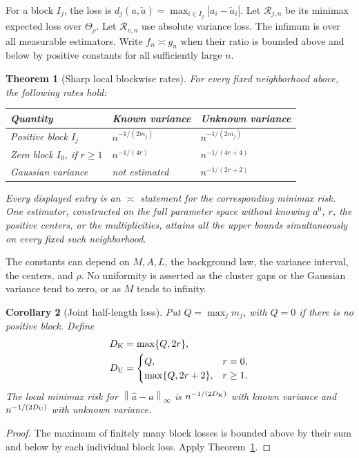 \documentclass[11pt,a4paper]{article}
\numberwithin{equation}{section}
\newtheorem{theorem}{Theorem}[section]
\newtheorem{corollary}[theorem]{Corollary}
\theoremstyle{definition}
\theoremstyle{remark}
\newcommand{\norm}[1]{\left\lVert#1\right\rVert}
\newcommand{\Risk}{\mathcal R}
\begin{document}
For a block $I_j$, the loss is
$d_j(a,\widetilde a)=\max_{i\in I_j}|a_i-\widetilde a_i|$.
Let $\Risk_{j,n}$ be its minimax expected loss over $\Theta_\rho$.
Let $\Risk_{v,n}$ use absolute variance loss. The infimum is over all
measurable estimators. Write $f_n\asymp g_n$ when their ratio is bounded above
and below by positive constants for all sufficiently large $n$.

\begin{theorem}[Sharp local blockwise rates]
\label{thm:main}
For every fixed neighborhood above, the following rates hold:
\begin{center}
\begin{tabular}{@{}lll@{}}
\toprule
Quantity & Known variance & Unknown variance\\
\midrule
Positive block $I_j$ & $n^{-1/(2m_j)}$ & $n^{-1/(2m_j)}$\\
Zero block $I_0$, if $r\ge1$ & $n^{-1/(4r)}$ & $n^{-1/(4r+4)}$\\
Gaussian variance & not estimated & $n^{-1/(2r+2)}$\\
\bottomrule
\end{tabular}
\end{center}
Every displayed entry is an $\asymp$ statement for the corresponding minimax
risk. One estimator, constructed on the full parameter space without knowing
$a^0$, $r$, the positive centers, or the multiplicities, attains all the upper
bounds simultaneously on every fixed such neighborhood.
\end{theorem}

The constants can depend on $M,A,L$, the background law, the variance interval,
the centers, and $\rho$. No uniformity is asserted as the cluster gaps or the
Gaussian variance tend to zero, or as $M$ tends to infinity.

\begin{corollary}[Joint half-length loss]
\label{cor:joint}
Put $Q=\max_jm_j$, with $Q=0$ if there is no positive block. Define
\begin{align}
 D_{\rm K}&=\max\{Q,2r\},\\
 D_{\rm U}&=
 \begin{cases}
 Q,&r=0,\\
 \max\{Q,2r+2\},&r\ge1.
 \end{cases}
\end{align}
The local minimax risk for $\norm{\widehat a-a}_\infty$ is
$n^{-1/(2D_{\rm K})}$ with known variance and
$n^{-1/(2D_{\rm U})}$ with unknown variance.
\end{corollary}
\begin{proof}
The maximum of finitely many block losses is bounded above by their sum and
below by each individual block loss. Apply Theorem~\ref{thm:main}.
\end{proof}
\end{document}
